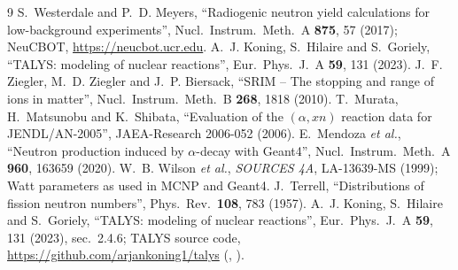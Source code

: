 \begin{thebibliography}{9}
 S.~Westerdale and P.~D. Meyers, ``Radiogenic neutron yield calculations for low-background experiments'', Nucl.\ Instrum.\ Meth.\ A \textbf{875}, 57 (2017); NeuCBOT, \url{https://neucbot.ucr.edu}.
 A.~J. Koning, S.~Hilaire and S.~Goriely, ``TALYS: modeling of nuclear reactions'', Eur.\ Phys.\ J.\ A \textbf{59}, 131 (2023).
 J.~F. Ziegler, M.~D. Ziegler and J.~P. Biersack, ``SRIM -- The stopping and range of ions in matter'', Nucl.\ Instrum.\ Meth.\ B \textbf{268}, 1818 (2010).
 T.~Murata, H.~Matsunobu and K.~Shibata, ``Evaluation of the $(\alpha,xn)$ reaction data for JENDL/AN-2005'', JAEA-Research 2006-052 (2006).
 E.~Mendoza \emph{et al.}, ``Neutron production induced by $\alpha$-decay with Geant4'', Nucl.\ Instrum.\ Meth.\ A \textbf{960}, 163659 (2020).
 W.~B. Wilson \emph{et al.}, \emph{SOURCES 4A}, LA-13639-MS (1999); Watt parameters as used in MCNP and Geant4.
 J.~Terrell, ``Distributions of fission neutron numbers'', Phys.\ Rev.\ \textbf{108}, 783 (1957).
 A.~J. Koning, S.~Hilaire and S.~Goriely, ``TALYS: modeling of nuclear reactions'', Eur.\ Phys.\ J.\ A \textbf{59}, 131 (2023), sec.~2.4.6; TALYS source code, \url{https://github.com/arjankoning1/talys} (, ).
\end{thebibliography}

